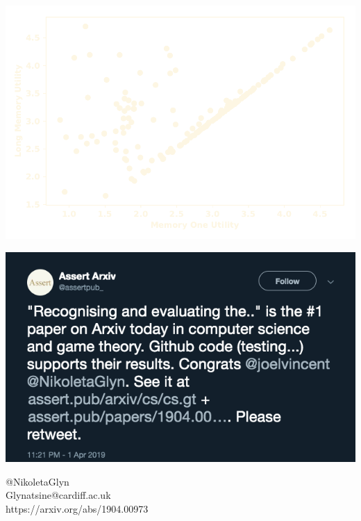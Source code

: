 \documentclass{beamer}
\begin{document}
\begin{frame}
    \begin{center}
        \includegraphics[width=\textwidth]{static/result_gambler}
    \end{center}
\end{frame}

\begin{frame}
    \begin{center}

        \hspace{-.7cm}
        
    \end{center}
\end{frame}

\begin{frame}
    \centering
    \includegraphics[width=.8\textwidth]{static/tweet}

    \vspace{.4cm}
    @NikoletaGlyn  \\ Glynatsine@cardiff.ac.uk \\

    \vspace{.3cm}
    \small{https://arxiv.org/abs/1904.00973}
\end{frame}
\end{document}
